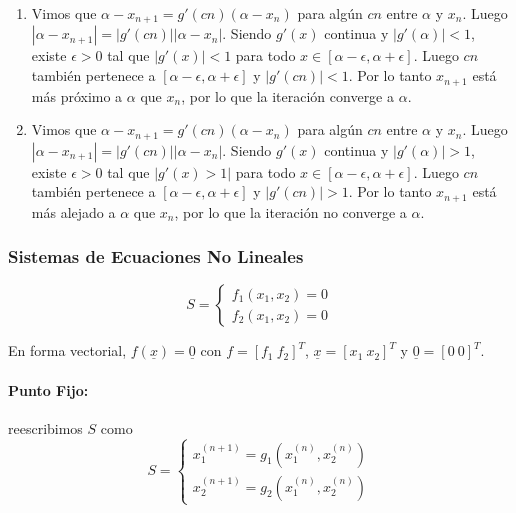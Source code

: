 \Demostracion 

\begin{enumerate}
\def\labelenumi{\arabic{enumi}.}
\item
  Vimos que \(\alpha - x_{n+1} = g'(cn)(\alpha - x_n)\) para algún
  \(cn\) entre \(\alpha\) y \(x_n\). Luego
  \(|\alpha - x_{n+1}| = |g'(cn)| |\alpha - x_n|\). Siendo \(g'(x)\)
  continua y \(|g'(\alpha)| < 1\), existe \(\epsilon > 0\) tal que
  \(|g'(x)| < 1\) para todo
  \(x \in [\alpha - \epsilon, \alpha + \epsilon]\). Luego \(cn\) también
  pertenece a \([\alpha - \epsilon, \alpha + \epsilon]\) y
  \(|g'(cn)| < 1\). Por lo tanto \(x_{n+1}\) está más próximo a
  \(\alpha\) que \(x_n\), por lo que la iteración converge a \(\alpha\).
\item
  Vimos que \(\alpha - x_{n+1} = g'(cn)(\alpha - x_n)\) para algún
  \(cn\) entre \(\alpha\) y \(x_n\). Luego
  \(|\alpha - x_{n+1}| = |g'(cn)| |\alpha - x_n|\). Siendo \(g'(x)\)
  continua y \(|g'(\alpha)| > 1\), existe \(\epsilon > 0\) tal que
  \(|g'(x) > 1|\) para todo
  \(x \in [\alpha - \epsilon, \alpha + \epsilon]\). Luego \(cn\) también
  pertenece a \([\alpha - \epsilon, \alpha + \epsilon]\) y
  \(|g'(cn)| > 1\). Por lo tanto \(x_{n+1}\) está más alejado a
  \(\alpha\) que \(x_n\), por lo que la iteración no converge a
  \(\alpha\).
\end{enumerate}

\hypertarget{sistemas-de-ecuaciones-no-lineales}{%
\subsubsection{Sistemas de Ecuaciones No
Lineales}\label{sistemas-de-ecuaciones-no-lineales}}

\[
S = 
\begin{cases}
f_1(x_1, x_2) = 0 \\ 
f_2(x_1, x_2) = 0
\end{cases}
\]

En forma vectorial, \(f(\underline{x}) = \underline{0}\) con
\(f = [f_1\  f_2]^T\), \(\underline{x} = [x_1\  x_2]^T\) y
\(\underline{0} = [0\  0]^T\).

\hypertarget{punto-fijo-1}{%
\paragraph{Punto Fijo:}\label{punto-fijo-1}}

reescribimos \(S\) como \[
S = 
\begin{cases}
x_1^{(n+1)} = g_1(x_1^{(n)}, x_2^{(n)}) \\ 
x_2^{(n+1)} = g_2(x_1^{(n)}, x_2^{(n)}) 
\end{cases}
\]

